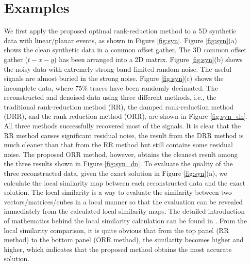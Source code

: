 \section{Examples}
We first apply the proposed optimal rank-reduction method to a 5D synthetic data with linear/planar events, as shown in Figure \ref{fig:syn}. Figure \ref{fig:syn}(a) shows the clean synthetic data in a common offset gather. The 3D common offset gather ($t-x-y$) has been arranged into a 2D matrix. Figure \ref{fig:syn}(b) shows the noisy data with extremely strong band-limited random noise. The useful signals are almost buried in the strong noise. Figure \ref{fig:syn}(c) shows the incomplete data, where 75\% traces have been randomly decimated. The reconstructed and denoised data using three different methods, i.e., the traditional rank-reduction method (RR), the damped rank-reduction method (DRR), and the  rank-reduction method (ORR), are shown in Figure \ref{fig:syn_dn}. All three methods successfully recovered most of the signals.  It is clear that the RR method causes significant residual noise, the result from the DRR method is much cleaner than that from the RR method but still contains some residual noise. The proposed ORR method, however, obtains the cleanest result among the three results shown in Figure \ref{fig:syn_dn}. To evaluate the quality of the three reconstructed data, given the exact solution in Figure \ref{fig:syn}(a), we calculate the local similarity map between each reconstructed data and the exact solution. The local similarity is a way to evaluate the similarity between two vectors/matrices/cubes in a local manner so that the evaluation can be revealed immediately from the calculated local similarity maps. The detailed introduction of mathematics behind the local similarity calculation can be found in \cite{yangkang2015ortho}. From the local similarity comparison, it is quite obvious that from the top panel (RR method) to the bottom panel (ORR method), the similarity becomes higher and higher, which indicates that the proposed method obtains the most accurate solution.

